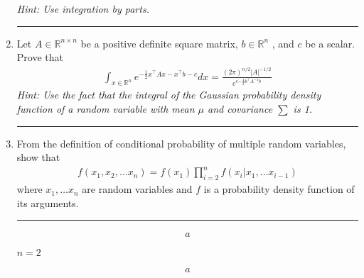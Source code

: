 \documentclass[12pt]{article}
\begin{document}
\begin{enumerate}
    \textit{Hint: Use integration by parts. }

    \noindent\rule{\linewidth}{1pt}
    \item Let $A \in \mathbb{R}^{n \times n}$ be a positive definite square matrix, $b \in \mathbb{R}^n$ , and $c$ be a scalar. Prove that
    \begin{align*}  
        \int_{x \in \mathbb{R}^n} e^{-\frac{1}{2} x^\intercal Ax-x^\intercal b-c } dx = \frac{(2\pi)^{n/2} |A|^{-1/2} }{e^{c{-\frac{1}{2}b^\intercal A^{-1} b}}}
    \end{align*}
    \textit{Hint: Use the fact that the integral of the Gaussian probability density function of a random variable with mean $\mu$ and covariance $\sum$ is 1.}
    
    \noindent\rule{\linewidth}{1pt}
    \item From the definition of conditional probability of multiple random variables, show that 
    \begin{align*}
        f(x_1,x_2, \dots x_n) = f(x_1) \prod_{i=2}^{n} f(x_i | x_1, \dots x_{i-1})
    \end{align*}
    where $x_1, \dots x_n$ are random variables and $f$ is a probability density function of its arguments. 

    \noindent\rule{\linewidth}{1pt}

    \begin{align*}
        a
    \end{align*}

    $n=2$

    \begin{align*}
        a
    \end{align*}
\end{enumerate}
\end{document}
